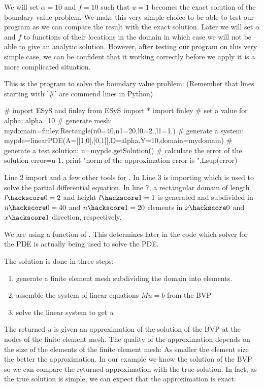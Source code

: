 We will set $\alpha=10$ and $f=10$ such that $u=1$ becomes the exact
solution of the boundary value problem.  We make this very simple
choice to be able to test our program as we can compare the result
with the exact solution. Later we will set $\alpha$ and $f$ to
functions of their locations in the domain in which case we will not
be able to give an analytic solution. However, after testing our
program on this very simple case, we can be confident that it working
correctly before we apply it is a more complicated situation.

This is the program to solve the boundary value problem: (Remember that
lines starting with '\#' are commend lines in Python)
%
\begin{python}
# import ESyS and finley
from ESyS import *
import finley
# set a value for alpha:
alpha=10
# generate mesh:
mydomain=finley.Rectangle(n0=40,n1=20,l0=2.,l1=1.)
# generate a system:
mypde=linearPDE(A=[[1,0],[0,1]],D=alpha,Y=10,domain=mydomain)
# generate a test solution:
u=mypde.getSolution()
# calculate the error of the solution
error=u-1.
print "norm of the approximation error is ",Lsup(error)
\end{python}
Line 2 import \escript and a few other tools for \ESyS. In Line 3 is
importing \finley which is used to solve the partial differential
equation. In line 7, a rectangular domain of length $l\hackscore 0=2$
and height $l\hackscore 1=1$ is generated and subdivided in
$n\hackscore 0=40$ and $n\hackscore 1=20$ elements in $x\hackscore 0$
and $x\hackscore 1$ direction, respectively.

We are using a function of \finley. This determines later in the code
which solver for the PDE is actually being used to solve the PDE.

The solution is done in three steps:
\begin{enumerate}
\item generate a finite element mesh subdividing the domain into elements.
\item assemble the system of linear equations $Mu=b$ from the BVP
\item solve the linear system to get $u$
\end{enumerate}
The returned $u$ is given an approximation of the solution of the BVP
at the nodes of the finite element mesh. The quality of the
approximation depends on the size of the elements of the finite
element mesh: As smaller the element size the better the
approximation.  In our example we know the solution of the BVP so we
can compare the returned approximation with the true solution.  In
fact, as the true solution is simple, we can expect that the
approximation is exact.

